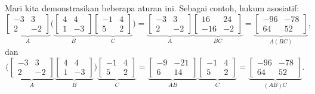 \begin{example}
Mari kita demonstrasikan beberapa aturan ini. Sebagai contoh, hukum asosiatif:
\begin{equation*}
\underbrace{
\begin{bmatrix}
-3 & 3 \\ 2 & -2
\end{bmatrix}
}_A
\biggl(
\underbrace{
\begin{bmatrix}
4 & 4 \\ 1 & -3
\end{bmatrix}
}_B
\underbrace{
\begin{bmatrix}
-1 & 4 \\ 5 & 2
\end{bmatrix}
}_C
\biggr)
=
\underbrace{
\begin{bmatrix}
-3 & 3 \\ 2 & -2
\end{bmatrix}
}_A
\underbrace{
\begin{bmatrix}
16 & 24 \\ -16 & -2
\end{bmatrix}
}_{BC}
=
\underbrace{
\begin{bmatrix}
-96 & -78 \\ 64 & 52
\end{bmatrix}
}_{A(BC)} ,
\end{equation*}
dan
\begin{equation*}
\biggl(
\underbrace{
\begin{bmatrix}
-3 & 3 \\ 2 & -2
\end{bmatrix}
}_A
\underbrace{
\begin{bmatrix}
4 & 4 \\ 1 & -3
\end{bmatrix}
}_B
\biggr)
\underbrace{
\begin{bmatrix}
-1 & 4 \\ 5 & 2
\end{bmatrix}
}_C
=
\underbrace{
\begin{bmatrix}
-9 & -21 \\ 6 & 14
\end{bmatrix}
}_{AB}
\underbrace{
\begin{bmatrix}
-1 & 4 \\ 5 & 2
\end{bmatrix}
}_C
=
\underbrace{
\begin{bmatrix}
-96 & -78 \\ 64 & 52
\end{bmatrix}
}_{(AB)C} .
\end{equation*}

\end{example}
